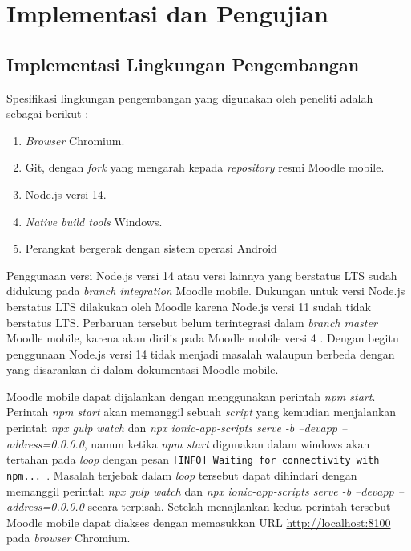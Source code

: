 \chapter{Implementasi dan Pengujian}

\section{Implementasi Lingkungan Pengembangan}
Spesifikasi lingkungan pengembangan yang digunakan oleh peneliti adalah sebagai berikut :

\begin{enumerate}
	\item \textit{Browser} Chromium.
	\item Git, dengan \textit{fork} yang mengarah kepada \textit{repository} resmi Moodle mobile.
	\item Node.js versi 14.
	\item \textit{Native build tools} Windows.
	\item Perangkat bergerak dengan sistem operasi Android
\end{enumerate} 

Penggunaan versi Node.js versi 14 atau versi lainnya yang berstatus LTS sudah didukung pada \textit{branch integration} Moodle mobile. Dukungan untuk versi Node.js berstatus LTS dilakukan oleh Moodle karena Node.js versi 11 sudah tidak berstatus LTS. Perbaruan tersebut belum terintegrasi dalam \textit{branch master} Moodle mobile, karena akan dirilis pada Moodle mobile versi 4\cite{MoodleTracker:Node11+} . Dengan begitu penggunaan Node.js versi 14 tidak menjadi masalah walaupun berbeda dengan yang disarankan di dalam dokumentasi Moodle mobile. 

Moodle mobile dapat dijalankan dengan menggunakan perintah \textit{npm start}.  Perintah \textit{npm start} akan memanggil sebuah \textit{script} yang kemudian menjalankan perintah \textit{npx gulp watch} dan \textit{npx ionic-app-scripts serve -b --devapp --address=0.0.0.0}, namun ketika \textit{npm start} digunakan dalam windows akan tertahan pada \textit{loop} dengan pesan \texttt{[INFO] Waiting for connectivity with npm...	}. Masalah terjebak dalam \textit{loop} tersebut dapat dihindari dengan memanggil perintah \textit{npx gulp watch} dan \textit{npx ionic-app-scripts serve -b --devapp --address=0.0.0.0} secara terpisah. Setelah menajlankan kedua perintah tersebut Moodle mobile dapat diakses dengan memasukkan URL \url{http://localhost:8100} pada \textit{browser} Chromium. 


